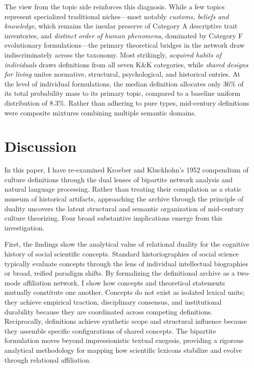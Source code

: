 \documentclass[11pt]{article}
\begin{document}
The view from the topic side reinforces this diagnosis. While a few topics represent specialized traditional niches---most notably \emph{customs, beliefs and knowledge}, which remains the insular preserve of Category A descriptive trait inventories, and \emph{distinct order of human phenomena}, dominated by Category F evolutionary formulations---the primary theoretical bridges in the network draw indiscriminately across the taxonomy. Most strikingly, \emph{acquired habits of individuals} draws definitions from all seven K\&K categories, while \emph{shared designs for living} unites normative, structural, psychological, and historical entries. At the level of individual formulations, the median definition allocates only 36\% of its total probability mass to its primary topic, compared to a baseline uniform distribution of 8.3\%. Rather than adhering to pure types, mid-century definitions were composite mixtures combining multiple semantic domains.

\section{Discussion}

In this paper, I have re-examined Kroeber and Kluckhohn's 1952 compendium of culture definitions through the dual lenses of bipartite network analysis and natural language processing. Rather than treating their compilation as a static museum of historical artifacts, approaching the archive through the principle of duality \citep{breiger1974} uncovers the latent structural and semantic organization of mid-century culture theorizing. Four broad substantive implications emerge from this investigation.

First, the findings show the analytical value of relational duality for the cognitive history of social scientific concepts. Standard historiographies of social science typically evaluate concepts through the lens of individual intellectual biographies or broad, reified paradigm shifts. By formalizing the definitional archive as a two-mode affiliation network, I show how concepts and theoretical statements mutually constitute one another. Concepts do not exist as isolated lexical units; they achieve empirical traction, disciplinary consensus, and institutional durability because they are coordinated across competing definitions. Reciprocally, definitions achieve synthetic scope and structural influence because they assemble specific configurations of shared concepts. The bipartite formulation moves beyond impressionistic textual exegesis, providing a rigorous analytical methodology for mapping how scientific lexicons stabilize and evolve through relational affiliation.
\end{document}
